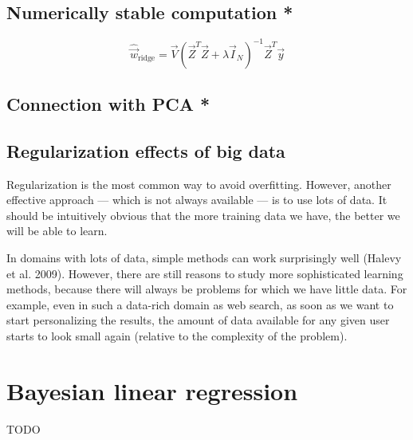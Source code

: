 \subsection{Numerically stable computation *}

\begin{equation}\label{eqn:Ridge-regression-SVD}
\hat{\vec{w}}_{\mathrm{ridge}}=\vec{V}(\vec{Z}^T\vec{Z}+\lambda\vec{I}_N)^{-1}\vec{Z}^T\vec{y}
\end{equation}


\subsection{Connection with PCA *}


\subsection{Regularization effects of big data}
Regularization is the most common way to avoid overfitting. However, another effective approach — which is not always available — is to use lots of data. It should be intuitively obvious that the more training data we have, the better we will be able to learn.

In domains with lots of data, simple methods can work surprisingly well (Halevy et al. 2009). However, there are still reasons to study more sophisticated learning methods, because there will always be problems for which we have little data. For example, even in such a data-rich domain as web search, as soon as we want to start personalizing the results, the amount of data available for any given user starts to look small again (relative to the complexity of the problem).


\section{Bayesian linear regression}
TODO

